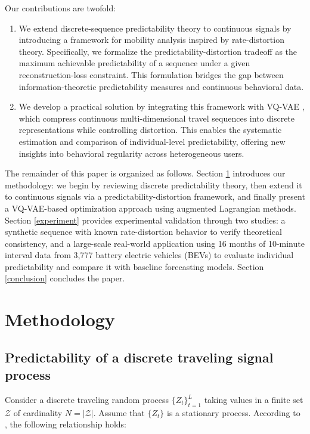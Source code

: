 \documentclass[12pt,review,authoryear]{elsarticle}
\theoremstyle{upright}
\begin{document}
Our contributions are twofold:
\begin{enumerate}[(1)]
    \item We extend discrete-sequence predictability theory to continuous signals by introducing a framework for mobility analysis inspired by rate-distortion theory. Specifically, we formalize the predictability-distortion tradeoff as the maximum achievable predictability of a sequence under a given reconstruction-loss constraint. This formulation bridges the gap between information-theoretic predictability measures and continuous behavioral data.
    
    \item We develop a practical solution by integrating this framework with VQ-VAE , which compress continuous multi-dimensional travel sequences into discrete representations while controlling distortion. This enables the systematic estimation and comparison of individual-level predictability, offering new insights into behavioral regularity across heterogeneous users.
\end{enumerate}

The remainder of this paper is organized as follows. Section \ref{Methodology} introduces our methodology: we begin by reviewing discrete predictability theory, then extend it to continuous signals via a predictability-distortion framework, and finally present a VQ-VAE-based optimization approach using augmented Lagrangian methods. Section \ref{experiment} provides experimental validation through two studies: a synthetic sequence with known rate-distortion behavior to verify theoretical consistency, and a large-scale real-world application using 16 months of 10-minute interval data from 3,777 battery electric vehicles (BEVs) to evaluate individual predictability and compare it with baseline forecasting models. Section \ref{conclusion} concludes the paper.








\section{Methodology}
\label{Methodology}

\subsection{Predictability of a discrete traveling signal process}
\noindent
Consider a discrete traveling random process 
$\{Z_t\}_{t=1}^L$ 
taking values in a finite set $\mathcal{Z}$ of cardinality $N = |\mathcal{Z}|$. Assume that $\{Z_t\}$ is a stationary process. According to \citet{song2010limits}, the following relationship holds:
\end{document}
